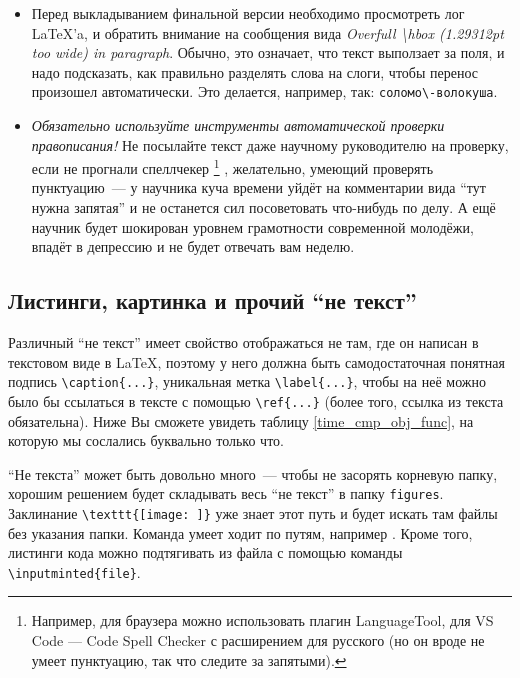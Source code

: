 \begin{itemize}
    \item Перед выкладыванием финальной версии необходимо просмотреть лог \LaTeX'a, и обратить внимание на сообщения вида \emph{Overfull \textbackslash hbox (1.29312pt too wide) in paragraph}. Обычно, это означает, что текст выползает за поля, и надо подсказать, как правильно разделять слова на слоги, чтобы перенос произошел автоматически.
          Это делается, например, так: \verb=соломо\-волокуша=.
    \item \emph{Обязательно используйте инструменты автоматической проверки правописания!}
          Не посылайте текст даже научному руководителю на проверку, если не прогнали спеллчекер%
          \footnote{Например, для браузера можно использовать плагин LanguageTool, для VS Code --- Code Spell Checker с расширением для русского (но он вроде не умеет пунктуацию, так что следите за запятыми).}%
          , желательно, умеющий проверять пунктуацию~--- у научника куча времени уйдёт на комментарии вида \enquote{тут нужна запятая} и не останется сил посоветовать что-нибудь по делу.
          А ещё научник будет шокирован уровнем грамотности современной молодёжи, впадёт в депрессию и не будет отвечать вам неделю.
\end{itemize}

\subsection{Листинги, картинка и прочий \enquote{не текст}}

Различный \enquote{не текст} имеет свойство отображаться не там, где он написан в текстовом виде в \LaTeX{}, поэтому у него должна быть самодостаточ\-ная понятная подпись \verb=\caption{...}=, уникальная метка \verb=\label{...}=, чтобы на неё можно было бы ссылаться в тексте с помощью \verb=\ref{...}= (более того, ссылка из текста обязательна).
Ниже Вы сможете увидеть таблицу \ref{time_cmp_obj_func}, на которую мы сослались буквально только что.

\enquote{Не текста} может быть довольно много~--- чтобы не засорять корневую папку, хорошим решением будет складывать весь \enquote{не текст} в папку \texttt{figures}.
Заклинание \verb=\texttt{[image: ]}= уже знает этот путь и будет искать там файлы без указания папки.
Команда \verb== умеет ходит по путям, например \verb==.
Кроме того, листинги кода можно подтягивать из файла с помощью команды \verb=\inputminted{file}=.


